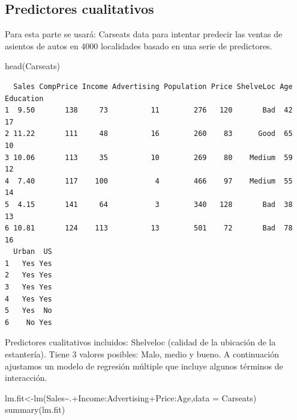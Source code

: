 \documentclass[
  letterpaper,
  DIV=11,
  numbers=noendperiod]{scrartcl}
\newenvironment{Shaded}{\begin{snugshade}}{\end{snugshade}}
\newcommand{\AttributeTok}[1]{\textcolor[rgb]{0.40,0.45,0.13}{#1}}
\newcommand{\FunctionTok}[1]{\textcolor[rgb]{0.28,0.35,0.67}{#1}}
\newcommand{\NormalTok}[1]{\textcolor[rgb]{0.00,0.23,0.31}{#1}}
\newcommand{\OtherTok}[1]{\textcolor[rgb]{0.00,0.23,0.31}{#1}}
\newcommand{\SpecialCharTok}[1]{\textcolor[rgb]{0.37,0.37,0.37}{#1}}
\begin{document}
\hypertarget{predictores-cualitativos-1}{%
\subsection{Predictores cualitativos}\label{predictores-cualitativos-1}}

Para esta parte se usará: Carseats data para intentar predecir las
ventas de asientos de autos en 4000 localidades basado en una serie de
predictores.

\begin{Shaded}
\begin{Highlighting}[]
\FunctionTok{head}\NormalTok{(Carseats)}
\end{Highlighting}
\end{Shaded}

\begin{verbatim}
  Sales CompPrice Income Advertising Population Price ShelveLoc Age Education
1  9.50       138     73          11        276   120       Bad  42        17
2 11.22       111     48          16        260    83      Good  65        10
3 10.06       113     35          10        269    80    Medium  59        12
4  7.40       117    100           4        466    97    Medium  55        14
5  4.15       141     64           3        340   128       Bad  38        13
6 10.81       124    113          13        501    72       Bad  78        16
  Urban  US
1   Yes Yes
2   Yes Yes
3   Yes Yes
4   Yes Yes
5   Yes  No
6    No Yes
\end{verbatim}

Predictores cualitativos incluidos: Shelveloc (calidad de la ubicación
de la estantería). Tiene 3 valores posibles: Malo, medio y bueno. A
continuación ajustamos un modelo de regresión múltiple que incluye
algunos términos de interacción.

\begin{Shaded}
\begin{Highlighting}[]
\NormalTok{lm.fit}\OtherTok{\textless{}{-}}\FunctionTok{lm}\NormalTok{(Sales}\SpecialCharTok{\textasciitilde{}}\NormalTok{.}\SpecialCharTok{+}\NormalTok{Income}\SpecialCharTok{:}\NormalTok{Advertising}\SpecialCharTok{+}\NormalTok{Price}\SpecialCharTok{:}\NormalTok{Age,}\AttributeTok{data =}\NormalTok{ Carseats)}
\FunctionTok{summary}\NormalTok{(lm.fit)}
\end{Highlighting}
\end{Shaded}
\end{document}
